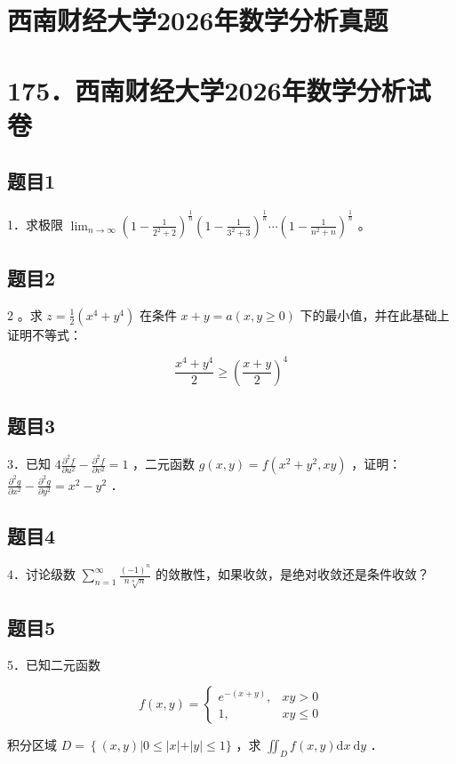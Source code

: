 \documentclass{article}
\begin{document}
\section*{西南财经大学2026年数学分析真题}
\section*{175．西南财经大学2026年数学分析试卷}

\subsection{题目1}
1．求极限 \(\lim _{n \rightarrow \infty}\left(1-\frac{1}{2^{2}+2}\right)^{\frac{1}{n}}\left(1-\frac{1}{3^{2}+3}\right)^{\frac{1}{n}} \cdots\left(1-\frac{1}{n^{2}+n}\right)^{\frac{1}{n}}\) 。

\subsection{题目2}
2 。求 \(z=\frac{1}{2}\left(x^{4}+y^{4}\right)\) 在条件 \(x+y=a(x, y \geq 0)\) 下的最小值，并在此基础上证明不等式：

\[
\frac{x^{4}+y^{4}}{2} \geq\left(\frac{x+y}{2}\right)^{4}
\]

\subsection{题目3}
3．已知 \(4 \frac{\partial^{2} f}{\partial u^{2}}-\frac{\partial^{2} f}{\partial v^{2}}=1\) ，二元函数 \(g(x, y)=f\left(x^{2}+y^{2}, x y\right)\) ，证明：\(\frac{\partial^{2} g}{\partial x^{2}}-\frac{\partial^{2} g}{\partial y^{2}}=x^{2}-y^{2}\) ．

\subsection{题目4}
4．讨论级数 \(\sum_{n=1}^{\infty} \frac{(-1)^{n}}{n \sqrt[n]{n}}\) 的敛散性，如果收敛，是绝对收敛还是条件收敛？

\subsection{题目5}
5．已知二元函数

\[
f(x, y)= \begin{cases}e^{-(x+y)}, & x y>0 \\ 1, & x y \leq 0\end{cases}
\]

积分区域 \(D=\left\{(x, y)|0 \leq|x|+|y| \leq 1\}\right.\) ，求 \(\iint_{D} f(x, y) \mathrm{d} x \mathrm{~d} y\) ．
\end{document}
